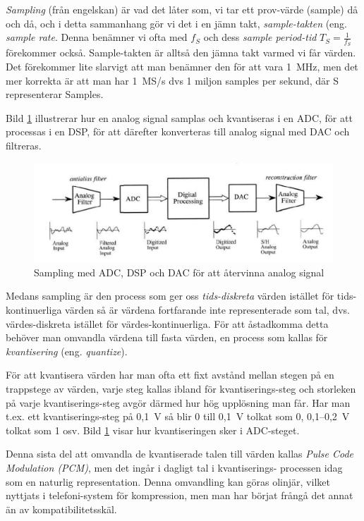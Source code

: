 \emph{Sampling} (från engelskan) är vad det låter som, vi tar ett prov-värde
(sample) då och då, och i detta sammanhang gör vi det i en jämn takt,
\emph{sample-takten} (eng. \emph{sample rate}.
Denna benämner vi ofta med \(f_S\) och dess \emph{sample period-tid}
\(T_S=\frac{1}{f_S}\) förekommer också.
Sample-takten är alltså den jämna takt varmed vi får värden.
Det förekommer lite slarvigt att man benämner den för att vara 1~MHz, men det
mer korrekta är att man har 1~MS/s dvs 1 miljon samples per sekund, där S
representerar Samples.

Bild \ref{fig:BildII1-37} illustrerar hur en analog signal samplas och
kvantiseras i en ADC, för att processas i en DSP, för att därefter konverteras
till analog signal med DAC och filtreras.

\begin{figure}
\begin{center}
\includegraphics[width=\textwidth]{images/cropped_pdfs/bild_2_1-37.pdf}
\caption{Sampling med ADC, DSP och DAC för att återvinna analog signal}
\label{fig:BildII1-37}
\end{center}
\end{figure}

Medans sampling är den process som ger oss \emph{tids-diskreta} värden istället
för tids-kontinuerliga värden så är värdena fortfarande inte representerade som
tal, dvs. värdes-diskreta istället för värdes-kontinuerliga.
För att åstadkomma detta behöver man omvandla värdena till fasta värden, en
process som kallas för \emph{kvantisering} (eng. \emph{quantize}).

För att kvantisera värden har man ofta ett fixt avstånd mellan stegen på en
trappstege av värden, varje steg kallas ibland för kvantiserings-steg och
storleken på varje kvantiserings-steg avgör därmed hur hög upplösning man får.
Har man t.ex. ett kvantiserings-steg på 0,1~V så blir 0 till 0,1~V tolkat som
0, 0,1--0,2~V tolkat som 1 osv.
Bild \ref{fig:BildII1-37} visar hur kvantiseringen sker i ADC-steget.

Denna sista del att omvandla de kvantiserade talen till värden kallas
\emph{Pulse Code Modulation (PCM)}, men det ingår i dagligt tal i kvantiserings-
processen idag som en naturlig representation.
Denna omvandling kan göras olinjär, vilket nyttjats i telefoni-system för
kompression, men man har börjat frångå det annat än av kompatibilitetsskäl.

